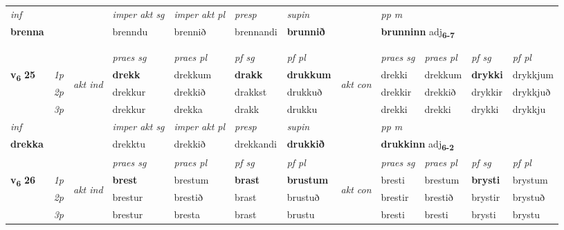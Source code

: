 \begin{longtable}[l]{X>{\footnotesize\itshape}llXXXXlXXXX}
   {\textit{inf}} & &  & \textit{imper akt sg} & \textit{imper akt pl}   & \textit{presp} & \textit{supin}  && \textit{pp m} \\*
  {\textbf{brenna}} & && brenndu  & brennið   & brennandi &  \textbf{brunnið}  && \multicolumn{2}{l}{\textbf{brunninn} adj\textbf{\textsubscript{6-7}}} \\*

\midrule
  & \\*
  & \\
   \midrule
 & &   & \textit{praes sg}  & \textit{praes pl}    & \textit{ pf sg} & \textit{pf pl} & & \textit{praes sg}  & \textit{praes pl}    & \textit{pf sg} & \textit{pf pl }  \\ \cmidrule{4-7} \cmidrule{9-12}
 \multirow{2}{*}{{{\textbf{v{\textsubscript{6}}} \Large{\textbf{25}}}}}  & 1p & \multirow{3}{*}{\begin{turn}{90}\textit{akt ind}\end{turn}} & \textbf{drekk} & drekkum & \textbf{drakk} & \textbf{drukkum} & \multirow{3}{*}{\begin{turn}{90}\textit{akt con}\end{turn}} &drekki & drekkum & \textbf{drykki} & drykkjum\\*
 & 2p &  &  drekkur  & drekkið & drakkst & drukkuð & & drekkir & drekkið & drykkir & drykkjuð \\*
 & 3p &  & drekkur & drekka & drakk & drukku & & drekki & drekki& drykki & drykkju \\*
\cmidrule{4-7} \cmidrule{9-12}

   {\textit{inf}} & &  & \textit{imper akt sg} & \textit{imper akt pl}   & \textit{presp} & \textit{supin}  && \textit{pp m} \\*
  {\textbf{drekka}} & && drekktu  & drekkið   & drekkandi &  \textbf{drukkið}  && \multicolumn{2}{l}{\textbf{drukkinn} adj\textbf{\textsubscript{6-2}}} \\*

\midrule

 & &   & \textit{praes sg}  & \textit{praes pl}    & \textit{ pf sg} & \textit{pf pl} & & \textit{praes sg}  & \textit{praes pl}    & \textit{pf sg} & \textit{pf pl }  \\ \cmidrule{4-7} \cmidrule{9-12}
 \multirow{2}{*}{{{\textbf{v{\textsubscript{6}}} \Large{\textbf{26}}}}}  & 1p & \multirow{3}{*}{\begin{turn}{90}\textit{akt ind}\end{turn}} & \textbf{brest} & brestum & \textbf{brast} & \textbf{brustum} & \multirow{3}{*}{\begin{turn}{90}\textit{akt con}\end{turn}} &bresti & brestum & \textbf{brysti} & brystum\\*
 & 2p &  &  brestur  & brestið & brast & brustuð & & brestir & brestið & brystir & brystuð \\*
 & 3p &  & brestur & bresta & brast & brustu & & bresti & bresti& brysti & brystu \\*
\cmidrule{4-7} \cmidrule{9-12}


\end{longtable}
